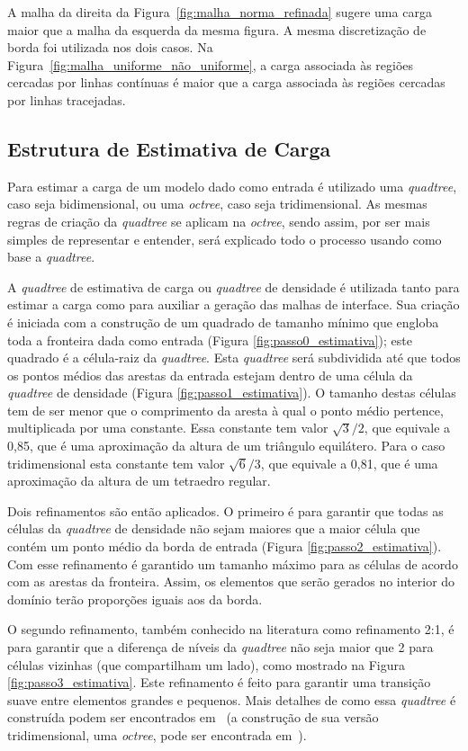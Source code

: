A malha da direita da Figura~\ref{fig:malha_norma_refinada} sugere uma carga maior que a malha da esquerda da mesma figura. A mesma discretização de borda foi utilizada nos dois casos. Na Figura~\ref{fig:malha_uniforme_não_uniforme}, a carga associada às regiões cercadas por linhas contínuas é maior que a carga associada às regiões cercadas por linhas tracejadas.

\subsection{Estrutura de Estimativa de Carga}

Para estimar a carga de um modelo dado como entrada é utilizado uma \textit{quadtree}, caso seja bidimensional, ou uma \textit{octree}, caso seja tridimensional. As mesmas regras de criação da \textit{quadtree} se aplicam na \textit{octree}, sendo assim, por ser mais simples de representar e entender, será explicado todo o processo usando como base a \textit{quadtree}.

A \textit{quadtree} de estimativa de carga ou \textit{quadtree} de densidade é utilizada tanto para estimar a carga como para auxiliar a geração das malhas de interface. Sua criação é iniciada com a construção de um quadrado de tamanho mínimo que engloba toda a fronteira dada como entrada (Figura \ref{fig:passo0_estimativa}); este quadrado é a célula-raiz da \textit{quadtree}. Esta \textit{quadtree} será subdividida até que todos os pontos médios das arestas da entrada estejam dentro de uma célula da \textit{quadtree} de densidade (Figura \ref{fig:passo1_estimativa}). O tamanho destas células tem de ser menor que o comprimento da aresta à qual o ponto médio pertence, multiplicada por uma constante. Essa constante tem valor $\sqrt{3}/2$, que equivale a 0,85, que é uma aproximação da altura de um triângulo equilátero. Para o caso tridimensional esta constante tem valor $\sqrt{6}/3$, que equivale a 0,81, que é uma aproximação da altura de um tetraedro regular.

Dois refinamentos são então aplicados. O primeiro é para garantir que todas as células da \textit{quadtree} de densidade não sejam maiores que a maior célula que contém um ponto médio da borda de entrada (Figura \ref{fig:passo2_estimativa}). Com esse refinamento é garantido um tamanho máximo para as células de acordo com as arestas da fronteira. Assim, os elementos que serão gerados no interior do domínio terão proporções iguais aos da borda. 

O segundo refinamento, também conhecido na literatura como refinamento 2:1, é para garantir que a diferença de níveis da \textit{quadtree} não seja maior que 2 para células vizinhas (que compartilham um lado), como mostrado na Figura \ref{fig:passo3_estimativa}. Este refinamento é feito para garantir uma transição suave entre elementos grandes e pequenos. Mais detalhes de como essa \textit{quadtree} é construída podem ser encontrados em~\cite{bib:Miranda99} (a construção de sua versão tridimensional, uma \textit{octree}, pode ser encontrada em~\cite{bib:Cavalcante-Neto01}).


